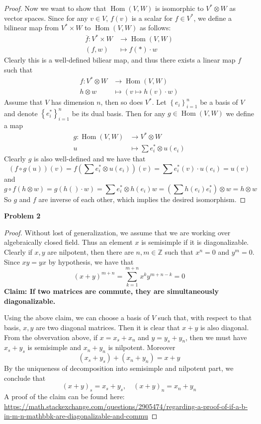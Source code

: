 \documentclass[12pt]{article} %
\DeclareMathOperator{\Hom}{Hom}
\begin{document}
\begin{proof}
    Now we want to show that $\Hom(V,W)$ is isomorphic to $V^*\otimes W$ as vector spaces. Since for any
    $v \in V$, $f(v)$ is a scalar for $f \in V^*$, we define a bilinear map from $V^* \times W$ to $\Hom(V,W)$ as follows:
    \begin{align*}
        \overline{f} \colon V^* \times W & \to \Hom(V,W)       \\
        (f,w)                            & \mapsto f(*)\cdot w
    \end{align*}
    Clearly this is a well-defined biliear map, and thus there exists a linear map $f$ such that
    \begin{align*}
        f \colon V^* \otimes W & \to \Hom(V,W)                  \\
        h\otimes w             & \mapsto (v\mapsto h(v)\cdot w)
    \end{align*}
    Assume that $V$ has dimension $n$, then so does $V^*$. Let $\left\lbrace e_i\right\rbrace_{i=1}^n$ be a basis of $V$ and
    denote $\left\lbrace e^*_i\right\rbrace_{i=1}^n$ be its dual basis. Then for any $g \in \Hom(V,W)$ we define a map
    \begin{align*}
        g \colon  \Hom(V,W) & \to V^* \otimes W                 \\
        u                   & \mapsto \sum e_i^* \otimes u(e_i)
    \end{align*}
    Clearly $g$ is also well-defined and we have that
    \[(f\circ g(u))(v) = f\left(\sum e_i^* \otimes u(e_i)\right)(v) = \sum e_i^*(v)\cdot u(e_i)=u(v)\]
    and
    \[g\circ f (h\otimes w)=g(h()\cdot w)=\sum e_i^* \otimes h(e_i)w = (\sum h(e_i)e_i^*)\otimes w=h\otimes w \]
    So $g$ and $f$ are inverse of each other, which implies the desired isomorphism.
\end{proof}
\textbf{Problem 2}
\begin{proof}
    Without lost of generalization, we assume that we are working over algebraically closed field.
    Thus an element $x$ is semisimple if it is diagonalizable. Clearly if $x,y$ are nilpotent, then there are $n,m \in \mathbb{Z}$ such that
    $x^n=0$ and $y^m=0$. Since $xy=yx$ by hypothesis, we have that
    \[(x+y)^{m+n} = \sum_{k=1}^{m+n} x^k y^{m+n-k} = 0\]
    \textbf{Claim: If two matrices are commute, they are simultaneously diagonalizable.}

    Using the above claim, we can choose a basis of $V$ such that, with respect to that basis, $x,y$ are two diagonal matrices.
    Then it is clear that $x+y$ is also diagonal.
    From the obvervation above, if $x = x_s+x_n$ and $y=y_s+y_n$, then we must have
    $x_s+y_s$ is semisimple and $x_n+y_n$ is nilpotent. Moreover
    \[(x_s+y_s)+(x_n+y_n) = x+y\]
    By the uniqueness of decomposition into semisimple and nilpotent part, we conclude that
    \[(x+y)_s=x_s+y_s,\quad (x+y)_n = x_n+y_n\]
    A proof of the claim can be found here: \url{https://math.stackexchange.com/questions/2905474/regarding-a-proof-of-if-a-b-in-m-n-mathbbk-are-diagonalizable-and-commu}
\end{proof}
\end{document}

